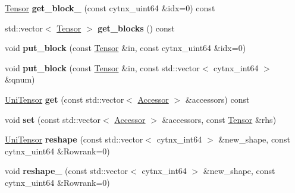 \begin{DoxyCompactItemize}
\item 
\mbox{\label{classcytnx_1_1UniTensor_a216d54f936554fa11b1edaff968d69d4}} 
\hyperlink{classcytnx_1_1Tensor}{Tensor} {\bfseries get\+\_\+block\+\_\+} (const cytnx\+\_\+uint64 \&idx=0) const
\item 
\mbox{\label{classcytnx_1_1UniTensor_a661bc7073dc51b16a4b9802bbcc3cba2}} 
std\+::vector$<$ \hyperlink{classcytnx_1_1Tensor}{Tensor} $>$ {\bfseries get\+\_\+blocks} () const
\item 
\mbox{\label{classcytnx_1_1UniTensor_abcd3008bf05771f0623ce1ef80b1085a}} 
void {\bfseries put\+\_\+block} (const \hyperlink{classcytnx_1_1Tensor}{Tensor} \&in, const cytnx\+\_\+uint64 \&idx=0)
\item 
\mbox{\label{classcytnx_1_1UniTensor_a9bf19662043d456a89a8e51215c67beb}} 
void {\bfseries put\+\_\+block} (const \hyperlink{classcytnx_1_1Tensor}{Tensor} \&in, const std\+::vector$<$ cytnx\+\_\+int64 $>$ \&qnum)
\item 
\mbox{\label{classcytnx_1_1UniTensor_a2e2d7f3137bb1cfb26e6a19acbc9563e}} 
\hyperlink{classcytnx_1_1UniTensor}{Uni\+Tensor} {\bfseries get} (const std\+::vector$<$ \hyperlink{classcytnx_1_1Accessor}{Accessor} $>$ \&accessors) const
\item 
\mbox{\label{classcytnx_1_1UniTensor_a90ba42a96ac324dfea7436d383fecc79}} 
void {\bfseries set} (const std\+::vector$<$ \hyperlink{classcytnx_1_1Accessor}{Accessor} $>$ \&accessors, const \hyperlink{classcytnx_1_1Tensor}{Tensor} \&rhs)
\item 
\mbox{\label{classcytnx_1_1UniTensor_a6c749dc601952c239225903371ddb669}} 
\hyperlink{classcytnx_1_1UniTensor}{Uni\+Tensor} {\bfseries reshape} (const std\+::vector$<$ cytnx\+\_\+int64 $>$ \&new\+\_\+shape, const cytnx\+\_\+uint64 \&Rowrank=0)
\item 
\mbox{\label{classcytnx_1_1UniTensor_aa1047de2e99ac2abd79ff4f74145d543}} 
void {\bfseries reshape\+\_\+} (const std\+::vector$<$ cytnx\+\_\+int64 $>$ \&new\+\_\+shape, const cytnx\+\_\+uint64 \&Rowrank=0)

\end{DoxyCompactItemize}
